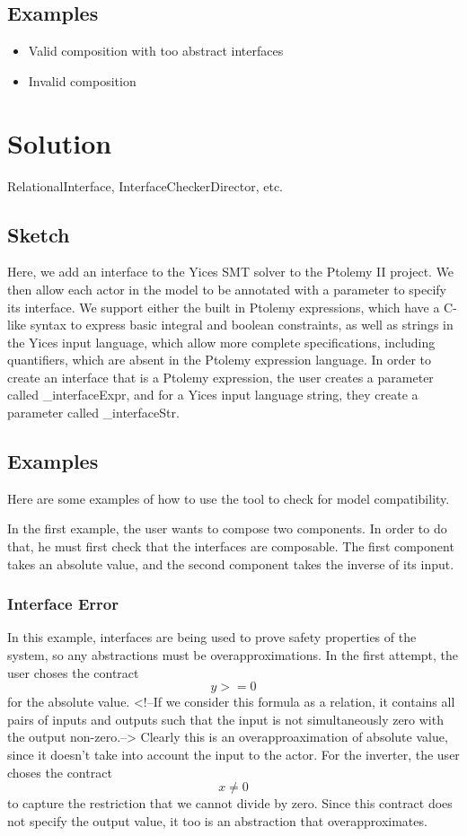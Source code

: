 \documentclass[preprint,11pt,authoryear]{sigplanconf}
\begin{document}
\subsection{Examples}
\begin{itemize}
	\item Valid composition with too abstract interfaces
	\item Invalid composition
\end{itemize}
\section{Solution}
RelationalInterface,
InterfaceCheckerDirector,
etc.

\subsection{Sketch}
Here, we add an interface to the Yices\cite{yices} SMT solver to the Ptolemy II\cite{ptII} project.  We then allow each actor in the model to be annotated with a parameter to specify its interface.  We support either the built in Ptolemy expressions, which have a C-like syntax to express basic integral and boolean constraints, as well as strings in the Yices input language, which allow more complete specifications, including quantifiers, which are absent in the Ptolemy expression language.  In order to create an interface that is a Ptolemy expression, the user creates a parameter called \_interfaceExpr, and for a Yices input language string, they create a parameter called \_interfaceStr.

\subsection{Examples}
Here are some examples of how to use the tool to check for model compatibility.

In the first example, the user wants to compose two components.  In order to do that, he must first check that the interfaces are composable.  The first component takes an absolute value, and the second component takes the inverse of its input.

\subsubsection{Interface Error}
In this example, interfaces are being used to prove safety properties of the system, so any abstractions must be overapproximations.  In the first attempt, the user choses the contract
\[
y >= 0
\]
for the absolute value.  <!--If we consider this formula as a relation, it contains all pairs of inputs and outputs such that the input is not simultaneously zero with the output non-zero.-->  Clearly this is an overapproaximation of absolute value, since it doesn't take into account the input to the actor.
For the inverter, the user choses the contract
\[
x \ne 0
\]
to capture the restriction that we cannot divide by zero.  Since this contract does not specify the output value, it too is an abstraction that overapproximates.
\end{document}
